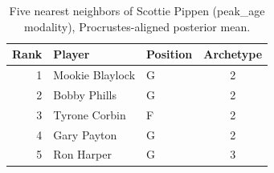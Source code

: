 \begin{table}[htbp]
  \centering\small
  \begin{tabular}{rllc}
    \toprule
    Rank & Player & Position & Archetype \\
    \midrule
    1 & Mookie Blaylock & G & 2 \\
    2 & Bobby Phills & G & 2 \\
    3 & Tyrone Corbin & F & 2 \\
    4 & Gary Payton & G & 2 \\
    5 & Ron Harper & G & 3 \\
    \bottomrule
  \end{tabular}
  \caption{Five nearest neighbors of Scottie Pippen (peak_age modality), Procrustes-aligned posterior mean.}
  \label{tab:Scottie_Pippen_neighbors_peak_age}
\end{table}


